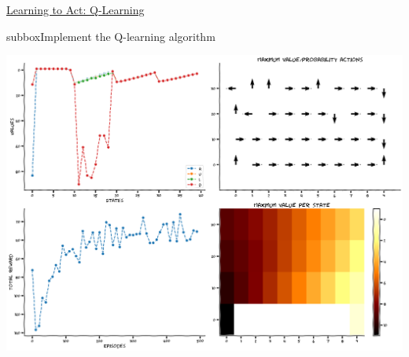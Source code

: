\begin{textbox}{\href{https://compneuro.neuromatch.io/tutorials/W3D4_ReinforcementLearning/student/W3D4_Tutorial3.html}{Learning to Act: Q-Learning } }
\begin{subbox}{subbox}{Implement the Q-learning algorithm}
\begin{center}
    
\includegraphics[scale=0.13]{Figures/RL/RL_Figure15.png}
\end{center}



\end{subbox}
\end{textbox}
\newpage
